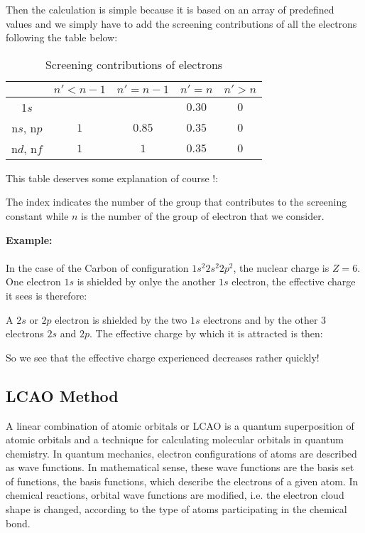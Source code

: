 	Then the calculation is simple because it is based on an array of predefined values and we simply have to add the screening contributions of all the electrons following the table below:
	\begin{table}[h!]\centering
		\begin{tabular}{ccccc}\hline
		& $n'<n-1$ & $n'=n-1$ & $n'=n$ & $n'>n$ \\\hline
		1$s$ & & & $0.30$ & $0$ \\
		n$s$, n$p$ & $1$ & $0.85$ & $0.35$ & $0$ \\
		n$d$, n$f$ & $1$ & $1$ & $0.35$ & $0$\\ \hline
		\end{tabular}
		\caption{Screening contributions of electrons}
	\end{table}
	This table deserves some explanation of course !:
	
	The index indicates the number of the group that contributes to the screening constant while $n$ is the number of the group of electron that we consider.
	
	\pagebreak
	\begin{tcolorbox}[colframe=black,colback=white,sharp corners]
	\textbf{{\Large {}}Example:}\\\\
	In the case of the Carbon of configuration $1s^2 2s^2 2p^2$, the nuclear charge is $Z=6$. One electron $1s$ is shielded by onlye the another $1s$ electron, the effective charge it sees is therefore:
	
	A $2s$ or $2p$ electron is shielded by the two $1s$ electrons and by the other $3$ electrons $2s$ and $2p$. The effective charge by which it is attracted is then:
	
	So we see that the effective charge experienced decreases rather quickly!
	\end{tcolorbox}
	
	\subsection{LCAO Method}
	A linear combination of atomic orbitals or LCAO is a quantum superposition of atomic orbitals and a technique for calculating molecular orbitals in quantum chemistry. In quantum mechanics, electron configurations of atoms are described as wave functions. In mathematical sense, these wave functions are the basis set of functions, the basis functions, which describe the electrons of a given atom. In chemical reactions, orbital wave functions are modified, i.e. the electron cloud shape is changed, according to the type of atoms participating in the chemical bond.
	
